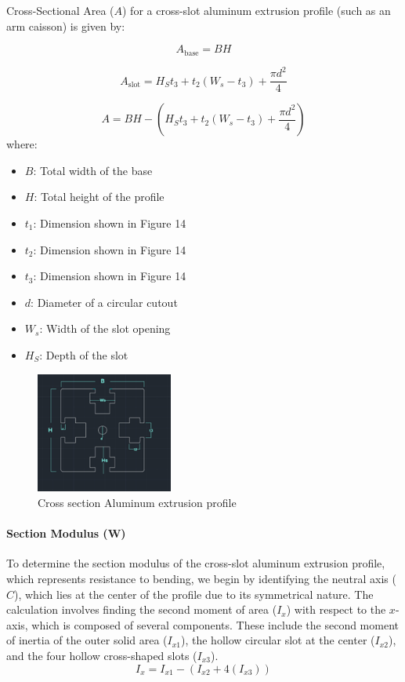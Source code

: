 \documentclass[../../main]{subfiles}
\begin{document}
Cross-Sectional Area ($A$) for a cross-slot aluminum extrusion profile (such as an arm caisson) is given by:

\begin{equation}
    A_{\text{base}} = BH \tag{19}
\end{equation}

\begin{equation}
    A_{\text{slot}} = H_St_3 + t_2\left(W_s - t_3\right) + \frac{\pi d^2}{4} \tag{20}
\end{equation}

\begin{equation}
    A = BH - \left(H_St_3 + t_2\left(W_s - t_3\right) + \frac{\pi d^2}{4}\right) \tag{21}
\end{equation}
where:

\begin{itemize}
    \item $B$: Total width of the base
    \item $H$: Total height of the profile
    \item $t_1$: Dimension shown in Figure 14
    \item $t_2$: Dimension shown in Figure 14
    \item $t_3$: Dimension shown in Figure 14
    \item $d$: Diameter of a circular cutout
    \item $W_s$: Width of the slot opening
    \item $H_S$: Depth of the slot
\end{itemize}


\begin{figure}[h!]
  \centering
  \includegraphics[width=0.4\textwidth]{img/n3.png}
  \caption{Cross section Aluminum extrusion profile}
\end{figure}
\newpage

\paragraph{Section Modulus (W)}
To determine the section modulus of the cross-slot aluminum extrusion profile, which represents resistance to bending, we begin by identifying the neutral axis ($C$), which lies at the center of the profile due to its symmetrical nature. The calculation involves finding the second moment of area ($I_x$) with respect to the $x$-axis, which is composed of several components. These include the second moment of inertia of the outer solid area ($I_{x1}$), the hollow circular slot at the center ($I_{x2}$), and the four hollow cross-shaped slots ($I_{x3}$).
\begin{equation}
  I_x = I_{x1} - \left(I_{x2} + 4(I_{x3})\right)
\end{equation}
\end{document}
